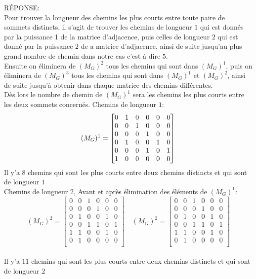 \begin{enumerate}[\rm 1)]
\begin{framed}
RÉPONSE: \\
Pour trouver la longueur des chemins les plus courts entre toute paire de sommets distincts, il s'agit de trouver les chemins de longueur $1$ qui est donnés par la puissance 1 de la matrice d'adjacence, puis celles de  longueur $2$ qui est donné par la puissance $2$ de a matrice d'adjacence, ainsi de suite jusqu'au plus grand nombre de chemin dans notre cas c'est à dire $5$. \\
Ensuite on éliminera  de $(M_G)^2$ tous les chemins qui sont dans $(M_G)^1$, puis on éliminera  de $(M_G)^3$ tous les chemins qui sont dans $(M_G)^1$ et $(M_G)^2$, ainsi de suite jusqu'à obtenir dans chaque matrice des chemins différentes.\\
Dès lors le nombre de chemin de $(M_G)^1$ sera les chemins les plus courts entre les deux sommets concernés.
Chemins de longueur $1$:\\
\[(M_G)^1= 
\begin{bmatrix}
 0&1 &0&0&0&0\\
 0&0 &1&0&0&0\\
 0&0 &0&1&0&0\\
 0&1 &0&0&1&0\\
 0&0 &0&1&0&1\\
 1&0 &0&0&0&0\\
\end{bmatrix}
\\
\]
Il y'a $8$ chemins qui sont les plus courts entre deux chemins distincts et qui sont de longueur $1$ \\
Chemins de longueur $2$, Avant et après élimination des éléments de $(M_G)^1$:\\
\[(M_G)^2=
\begin{bmatrix}
 0&0 &1&0&0&0\\
 0&0 &0&1&0&0\\
 0&1 &0&0&1&0\\
 0&0 &1&1&0&1\\
 1&1 &0&0&1&0\\
 0&1 &0&0&0&0\\
\end{bmatrix}
\quad (M_G)^2= 
\begin{bmatrix}
 0&0 &1&0&0&0\\
 0&0 &0&1&0&0\\
 0&1 &0&0&1&0\\
 0&0 &1&1&0&1\\
 1&1 &0&0&1&0\\
 0&1 &0&0&0&0\\
\end{bmatrix}
\] 
\\
Il y'a $11$ chemins qui sont les plus courts entre deux chemins distincts et qui sont de longueur $2$ \\


\end{framed}
\end{enumerate}
